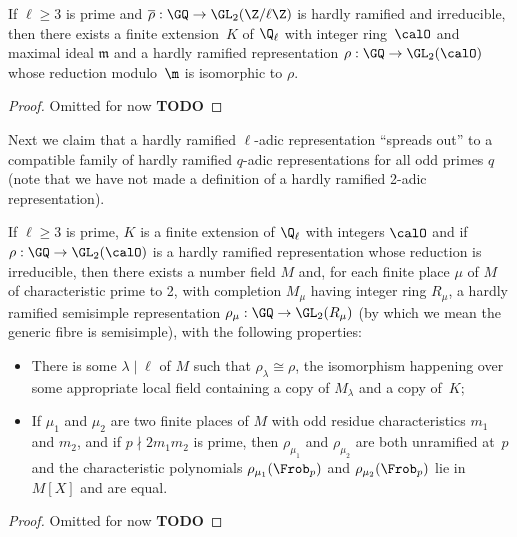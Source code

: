 \begin{theorem}
  \label{hardly_ramified_lifts}
  \leanok
  If $\ell\geq3$ is prime and $\overline{\rho}:\GQ\to\GL_2(\Z/\ell\Z)$
  is hardly ramified and irreducible, then there exists a finite extension~$K$ of $\Q_\ell$
  with integer ring~$\calO$ and maximal ideal $\mathfrak{m}$
  and a hardly ramified representation
  $\rho:\GQ\to\GL_2(\calO)$ whose reduction modulo~$\m$ is isomorphic to $\rho$.
\end{theorem}
\begin{proof}
  Omitted for now {\bf TODO}
\end{proof}

Next we claim that a hardly ramified $\ell$-adic representation ``spreads out'' to a compatible
family of hardly ramified $q$-adic representations for all odd primes $q$ (note that we have
not made a definition of a hardly ramified 2-adic representation).

\begin{theorem}
  \label{hardly_ramified_spreads_out}
  \leanok
  If $\ell\geq3$ is prime, $K$ is a finite extension of $\Q_\ell$
  with integers $\calO$ and if $\rho:\GQ\to\GL_2(\calO)$ is a hardly ramified representation
  whose reduction is irreducible,
  then there exists a number field $M$ and, for each finite place $\mu$ of $M$
  of characteristic prime to 2, with completion $M_\mu$ having integer ring $R_\mu$,
  a hardly ramified semisimple representation $\rho_\mu:\GQ\to\GL_2(R_\mu)$ (by which we
  mean the generic fibre is semisimple), with the following properties:
  \begin{itemize}
    \item There is some $\lambda\mid\ell$ of $M$ such that $\rho_\lambda\cong\rho$,
      the isomorphism happening over some appropriate local field containing a copy
      of $M_\lambda$ and a copy of~$K$;
    \item If $\mu_1$ and $\mu_2$ are two finite places of $M$ with odd residue characteristics $m_1$
      and $m_2$, and if $p\nmid 2m_1m_2$ is prime, then $\rho_{\mu_1}$ and $\rho_{\mu_2}$
      are both unramified at~$p$ and the characteristic polynomials $\rho_{\mu_1}(\Frob_p)$
      and $\rho_{\mu_2}(\Frob_p)$ lie in $M[X]$ and are equal.
  \end{itemize}
\end{theorem}
\begin{proof}
  Omitted for now {\bf TODO}
\end{proof}

